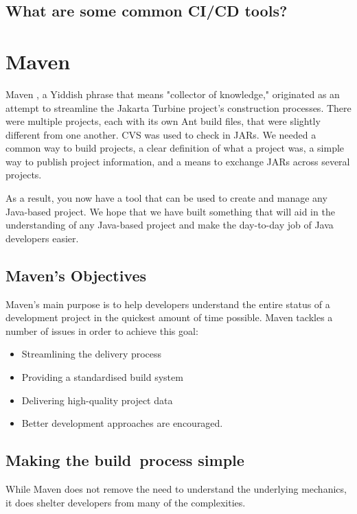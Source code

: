 \subsection*{What are some common CI/CD tools?}
\section {Maven}

\tab Maven \cite{introducing_maven}, a Yiddish phrase that means "collector of knowledge," originated as an attempt to streamline the Jakarta Turbine project's construction processes. There were multiple projects, each with its own Ant build files, that were slightly different from one another. CVS was used to check in JARs. We needed a common way to build projects, a clear definition of what a project was, a simple way to publish project information, and a means to exchange JARs across several projects.

\tab As a result, you now have a tool that can be used to create and manage any Java-based project. We hope that we have built something that will aid in the understanding of any Java-based project and make the day-to-day job of Java developers easier.

\subsection*{Maven's Objectives}
\tab Maven's main purpose is to help developers understand the entire status of a development project in the quickest amount of time possible. Maven tackles a number of issues in order to achieve this goal:

\begin{itemize}
    \item Streamlining the delivery process
    \item Providing a standardised build system
    \item Delivering high-quality project data
    \item Better development approaches are encouraged.
\end{itemize}

\subsection*{Making the build process simple}
\tab While Maven does not remove the need to understand the underlying mechanics, it does shelter developers from many of the complexities.

